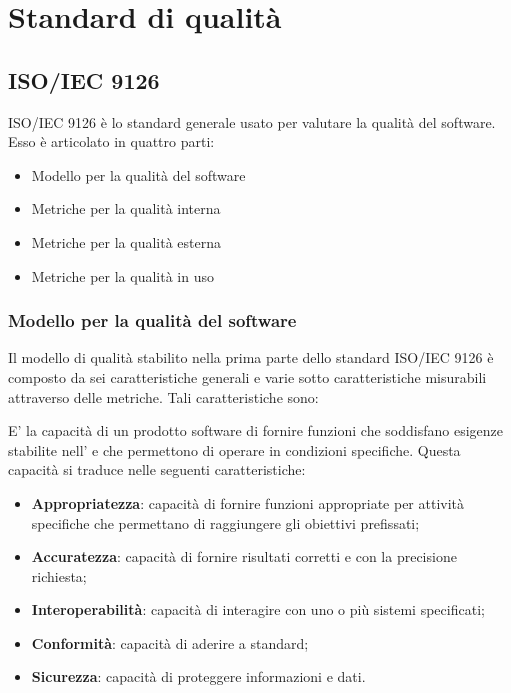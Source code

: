 \section{Standard di qualità}

\subsection{ISO/IEC 9126}
ISO/IEC 9126 è lo standard generale usato per valutare la qualità del software. Esso è articolato in quattro parti:
\begin{itemize}
	\item{Modello per la qualità del software}
	\item{Metriche per la qualità interna}
	\item{Metriche per la qualità esterna}
	\item{Metriche per la qualità in uso}
\end{itemize}

	\subsubsection{Modello per la qualità del software}
	Il modello di qualità stabilito nella prima parte dello standard ISO/IEC 9126 è composto da sei caratteristiche generali e varie sotto caratteristiche misurabili attraverso delle metriche. Tali caratteristiche sono:
	
	E' la capacità di un prodotto software di fornire funzioni che soddisfano esigenze stabilite nell'\AdR{} e che permettono di operare in condizioni specifiche. Questa capacità si traduce nelle seguenti caratteristiche:
	\begin{itemize}
		\item{\textbf{Appropriatezza}: capacità di fornire funzioni appropriate per attività specifiche che permettano di raggiungere gli obiettivi prefissati;}
		\item{\textbf{Accuratezza}: capacità di fornire risultati corretti e con la precisione richiesta;}
		\item{\textbf{Interoperabilità}: capacità di interagire con uno o più sistemi specificati;}
		\item{\textbf{Conformità}: capacità di aderire a standard;}
		\item{\textbf{Sicurezza}: capacità di proteggere informazioni e dati.}
	\end{itemize}
	
